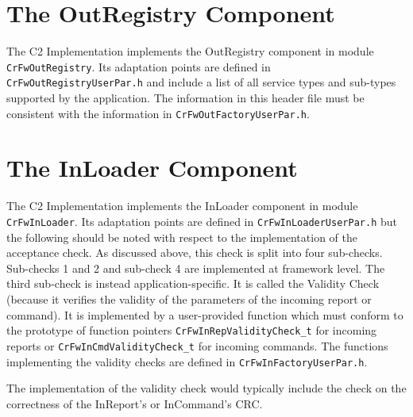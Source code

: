 \documentclass{pnp_article}
\begin{document}
\section{The OutRegistry Component}\label{sec:OutRegistry}


The C2 Implementation implements the OutRegistry component in module \texttt{CrFwOutRegistry}. Its adaptation points are defined in \texttt{CrFwOutRegistryUserPar.h} and include a list of all service types and sub-types supported by the application. The information in this header file must be consistent with the information in \texttt{CrFwOutFactoryUserPar.h}.

\clearpage
\section{The InLoader Component}\label{sec:InLoader}


The C2 Implementation implements the InLoader component in module \texttt{CrFwInLoader}. Its adaptation points are defined in \texttt{CrFwInLoaderUserPar.h} but the following should be noted with respect to the implementation of the acceptance check. As discussed above, this check is split into four sub-checks. Sub-checks 1 and 2 and sub-check 4 are implemented at framework level. The third sub-check is instead application-specific. It is called the Validity Check (because it verifies the validity of the parameters of the incoming report or command).  It is implemented by a user-provided function which must conform to the prototype of function pointers \texttt{CrFwInRepValidityCheck\_t} for incoming reports or \texttt{CrFwInCmdValidityCheck\_t} for incoming commands. The functions implementing the validity checks are defined in \texttt{CrFwInFactoryUserPar.h}.

The implementation of the validity check would typically include the check on the correctness of the InReport's or InCommand's CRC.

\end{document}
